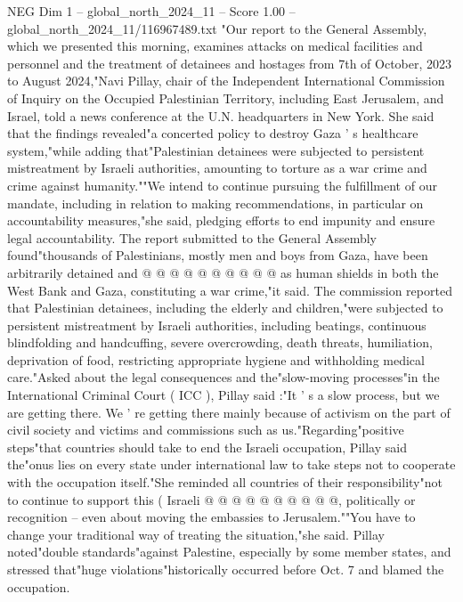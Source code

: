 \begin{textsample}{NEG Dim 1 – global\_north\_2024\_11 – Score 1.00 – global\_north\_2024\_11/116967489.txt}  \label{ex:f1_neg_218}
"Our report to the General Assembly, which we presented this morning, examines attacks on medical facilities and personnel and the treatment of detainees and hostages from 7th of October, 2023 to August 2024,"Navi Pillay, chair of the Independent International Commission of Inquiry on the Occupied Palestinian Territory, including East Jerusalem, and Israel, told a news conference at the U.N. headquarters in New York.
She said that the findings revealed"a concerted policy to destroy Gaza ' s healthcare system,"while adding that"Palestinian detainees were subjected to persistent mistreatment by Israeli authorities, amounting to torture as a war crime and crime against humanity.""We intend to continue pursuing the fulfillment of our mandate, including in relation to making recommendations, in particular on accountability measures,"she said, pledging efforts to end impunity and ensure legal accountability.
The report submitted to the General Assembly found"thousands of Palestinians, mostly men and boys from Gaza, have been arbitrarily detained and @ @ @ @ @ @ @ @ @ @ as human shields in both the West Bank and Gaza, constituting a war crime,"it said.
The commission reported that Palestinian detainees, including the elderly and children,"were subjected to persistent mistreatment by Israeli authorities, including beatings, continuous blindfolding and handcuffing, severe overcrowding, death threats, humiliation, deprivation of food, restricting appropriate hygiene and withholding medical care."Asked about the legal consequences and the"slow-moving processes"in the International Criminal Court ( ICC ), Pillay said :"It ' s a slow process, but we are getting there.
We ' re getting there mainly because of activism on the part of civil society and victims and commissions such as us."Regarding"positive steps"that countries should take to end the Israeli occupation, Pillay said the"onus lies on every state under international law to take steps not to cooperate with the occupation itself."She reminded all countries of their responsibility"not to continue to support this ( Israeli @ @ @ @ @ @ @ @ @ @, politically or recognition -- even about moving the embassies to Jerusalem.""You have to change your traditional way of treating the situation,"she said.
Pillay noted"double standards"against Palestine, especially by some member states, and stressed that"huge violations"historically occurred before Oct. 7 and blamed the occupation.

\end{textsample}
